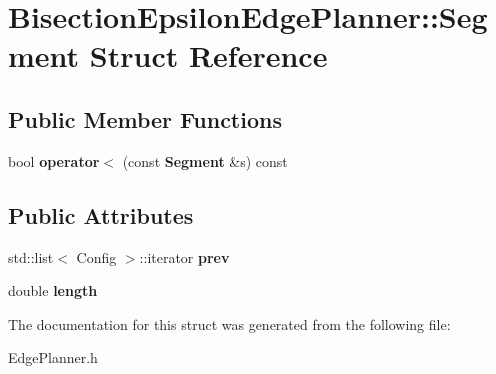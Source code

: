 \section{Bisection\+Epsilon\+Edge\+Planner\+:\+:Segment Struct Reference}
\label{structBisectionEpsilonEdgePlanner_1_1Segment}
\subsection*{Public Member Functions}
\begin{DoxyCompactItemize}
\item 
bool {\bfseries operator$<$} (const {\bf Segment} \&s) const \label{structBisectionEpsilonEdgePlanner_1_1Segment_a7a21c6b86f6f02ce54e2ae81b49ed362}

\end{DoxyCompactItemize}
\subsection*{Public Attributes}
\begin{DoxyCompactItemize}
\item 
std\+::list$<$ Config $>$\+::iterator {\bfseries prev}\label{structBisectionEpsilonEdgePlanner_1_1Segment_a2cc9c90f27774509bd3429e38c0cade0}

\item 
double {\bfseries length}\label{structBisectionEpsilonEdgePlanner_1_1Segment_a4ec47218f12e14f70067b90fdc01c2a1}

\end{DoxyCompactItemize}


The documentation for this struct was generated from the following file\+:\begin{DoxyCompactItemize}
\item 
Edge\+Planner.\+h\end{DoxyCompactItemize}
